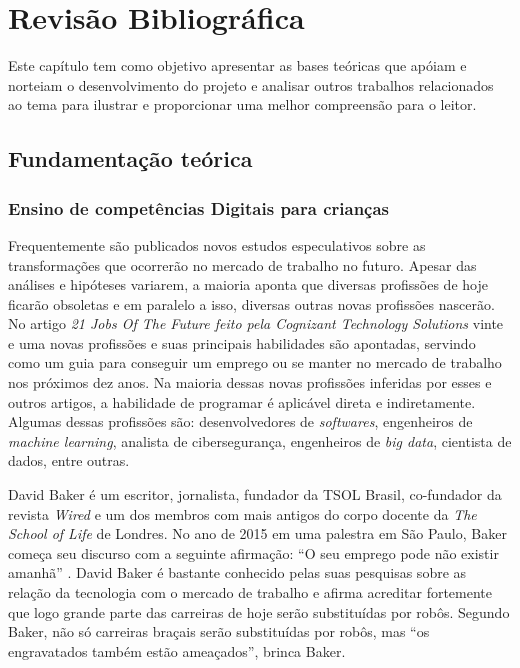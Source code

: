 \chapter{Revisão Bibliográfica} \label{cap:rev}
Este capítulo tem como objetivo apresentar as bases teóricas que apóiam e norteiam o desenvolvimento do projeto e analisar outros trabalhos relacionados ao tema para ilustrar e proporcionar uma melhor compreensão para o leitor.

\section{Fundamentação teórica} 

\subsection{Ensino de competências Digitais para crianças}

Frequentemente são publicados novos estudos especulativos sobre as transformações que ocorrerão no mercado de trabalho no futuro. Apesar das análises e hipóteses variarem, a maioria aponta que diversas profissões de hoje ficarão obsoletas e em paralelo a isso, diversas outras novas profissões nascerão. No artigo \textit{21 Jobs Of The Future feito pela Cognizant Technology Solutions} \cite{cognizant_2017} vinte e uma novas profissões e suas principais habilidades são apontadas, servindo como um guia para conseguir um emprego ou se manter no mercado de trabalho nos próximos dez anos. Na maioria dessas novas profissões inferidas por esses e outros artigos, a habilidade de programar é aplicável direta e indiretamente. Algumas dessas profissões são: desenvolvedores de \textit{softwares}, engenheiros de \textit{machine learning}, analista de cibersegurança, engenheiros de \textit{big data}, cientista de dados, entre outras.

David Baker é um escritor, jornalista, fundador da TSOL Brasil, co-fundador da revista \textit{Wired} e um dos membros com mais antigos do corpo docente da \textit{The School of Life} de Londres. No ano de 2015 em uma palestra em São Paulo, Baker começa seu discurso com a seguinte afirmação: “O seu emprego pode não existir amanhã” \cite{carvalho_2015}. David Baker é bastante conhecido pelas suas pesquisas sobre as relação da tecnologia com o mercado de trabalho e afirma acreditar fortemente que logo grande parte das carreiras de hoje serão substituídas por robôs. Segundo Baker, não só carreiras braçais serão substituídas por robôs, mas “os engravatados também estão ameaçados”, brinca Baker.

